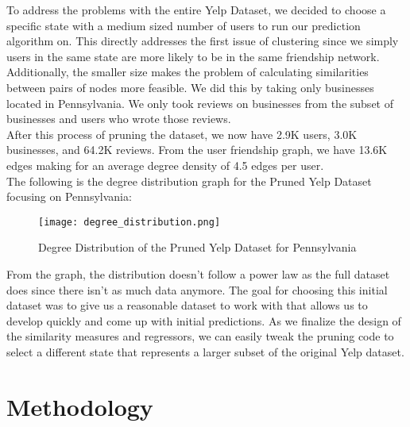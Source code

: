 \documentclass[10pt]{article}
\begin{document}
To address the problems with the entire Yelp Dataset, we decided to choose a specific state with a medium sized number of users to run our prediction algorithm on. This directly addresses the first issue of clustering since we simply users in the same state are more likely to be in the same friendship network. Additionally, the smaller size makes the problem of calculating similarities between pairs of nodes more feasible. We did this by taking only businesses located in Pennsylvania. We only took reviews on businesses from the subset of businesses and users who wrote those reviews.\\

After this process of pruning the dataset, we now have 2.9K users, 3.0K businesses, and 64.2K reviews. From the user friendship graph, we have 13.6K edges making for an average degree density of 4.5 edges per user. \\

The following is the degree distribution graph for the Pruned Yelp Dataset focusing on Pennsylvania:

\begin{figure}[h]
\centering
\texttt{[image: degree\_distribution.png]}
\caption{Degree Distribution of the Pruned Yelp Dataset for Pennsylvania}
\end{figure}

From the graph, the distribution doesn't follow a power law as the full dataset does since there isn't as much data anymore. The goal for choosing this initial dataset was to give us a reasonable dataset to work with that allows us to develop quickly and come up with initial predictions. As we finalize the design of the similarity measures and regressors, we can easily tweak the pruning code to select a different state that represents a larger subset of the original Yelp dataset.

\section{Methodology}
\label{sec:conc}
\end{document}
